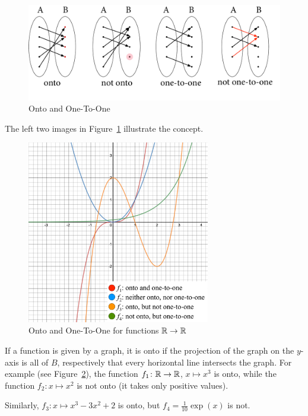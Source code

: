 \begin{figure}[t]
\begin{center}
\includegraphics[width=\the\textwidth]{pic/OntoPics.pdf}
\caption{Onto and One-To-One}
\label{figoneonto}
\end{center}
\end{figure}

The left two images in Figure~\ref{figoneonto} illustrate the concept.

\begin{figure}[t]
\begin{center}
\includegraphics[width=8cm]{pic/OneToOneOnto.pdf}
\caption{Onto and One-To-One for functions ${\mathbb R}\to{\mathbb R}$}
\label{figoneontofcts}
\end{center}
\end{figure}

If a function is given by a graph, it is onto if the projection of the graph
on the $y$-axis is all of $B$, respectively that every horizontal line intersects the
graph.
For example (see Figure~\ref{figoneontofcts}), the function $f_1\colon{\mathbb R}\to{\mathbb R}$, $x\mapsto x^3$ is onto, while
the function $f_2\colon x\mapsto x^2$ is not onto (it takes only positive
values).

Similarly, $f_3\colon x\mapsto x^3-3x^2+2$ is
onto, but $f_4=\frac{1}{10}\exp(x)$ is not.

